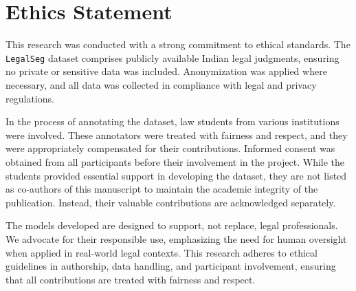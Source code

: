 \section*{Ethics Statement}
This research was conducted with a strong commitment to ethical standards. The \texttt{LegalSeg} dataset comprises publicly available Indian legal judgments, ensuring no private or sensitive data was included. Anonymization was applied where necessary, and all data was collected in compliance with legal and privacy regulations.

In the process of annotating the dataset, law students from various institutions were involved. These annotators were treated with fairness and respect, and they were appropriately compensated for their contributions. Informed consent was obtained from all participants before their involvement in the project. While the students provided essential support in developing the dataset, they are not listed as co-authors of this manuscript to maintain the academic integrity of the publication. Instead, their valuable contributions are acknowledged separately.

The models developed are designed to support, not replace, legal professionals. We advocate for their responsible use, emphasizing the need for human oversight when applied in real-world legal contexts. This research adheres to ethical guidelines in authorship, data handling, and participant involvement, ensuring that all contributions are treated with fairness and respect.
\newpage